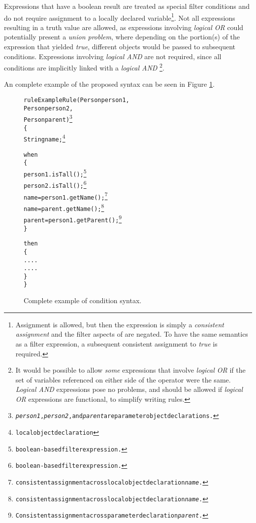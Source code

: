 \documentclass[10pt,twocolumn,letterpaper,colorhighlight]{article}
\newenvironment{codelisting}%
	{\begin{minipage}{250pt}\small\begin{alltt}}%
	{\end{alltt}\end{minipage}}
\begin{document}
Expressions that have a boolean result are treated as special filter
conditions and do not require assignment to a locally declared
variable\footnote{Assignment is allowed, but then the expression
is simply a \emph{consistent assignment} and the filter
aspects of are negated.  To have the same semantics as a filter
expression, a subsequent consistent assignment to \emph{true} is
required.}. Not all expressions resulting in a truth value are allowed,
as expressions involving \emph{logical OR} could potentially present 
a \emph{union problem}, where depending on the portion(s) of the 
expression that yielded \emph{true}, different objects would be passed
to subsequent conditions.  Expressions involving \emph{logical AND} are not
required, since all conditions are implicitly linked with a 
\emph{logical AND}%
	\footnote{%
		It would be possible to allow \emph{some} expressions that
		involve \emph{logical OR} if the set of variables referenced
		on either side of the operator were the same.  \emph{Logical
		AND} expressions pose no problems, and should be allowed if
		\emph{logical OR} expressions are functional, to simplify
		writing rules.
	}.

An complete example of the proposed syntax can be seen in Figure
\ref{example.syntax.complete}.

\begin{figure}
	\begin{codelisting}
	rule ExampleRule(Person person1,
	                 Person person2,
	                 Person parent)\footnote{\emph{person1}, \emph{person2}, and \emph{parent} are parameter object declarations.}
    \{
        String name;\footnote{local object declaration}

        when 
        \{
            person1.isTall();\footnote{boolean-based filter expression.}
            person2.isTall();\footnote{boolean-based filter expression.}
            name   = person1.getName();\footnote{consistent assignment across local object declaration \emph{name}.}
            name   = parent.getName();\footnote{consistent assignment across local object declaration \emph{name}.}
            parent = person1.getParent();\footnote{Consistent assignment across parameter declaration \emph{parent}.}
        \}

        then
        \{
            ....
            ....
        \}
    \}
	\end{codelisting}
	\caption{Complete example of condition syntax.}
	\label{example.syntax.complete}
\end{figure}
\end{document}
